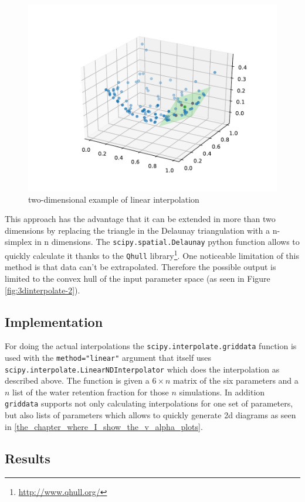 \begin{figure}[h] %
	\centering
	\includegraphics[width=0.8\linewidth]{images/vis2d3.pdf}
	\caption{two-dimensional example of linear interpolation}
	\label{fig:3dinterpolate-3}
\end{figure}

This approach has the advantage that it can be extended in more than two dimensions by replacing the triangle in the Delaunay triangulation with a n-simplex in n dimensions. The \texttt{scipy.spatial.Delaunay} python function allows to quickly calculate it thanks to the \texttt{Qhull} library\footnote{\url{http://www.qhull.org/}}. One noticeable limitation of this method is that data can't be extrapolated. Therefore the possible output is limited to the convex hull of the input parameter space (as seen in Figure \ref{fig:3dinterpolate-2}).

\subsection{Implementation}
\label{sec:griddata-implementation}
For doing the actual interpolations the \texttt{scipy.interpolate.griddata} function is used with the \texttt{method="linear"} argument that itself uses \texttt{scipy.interpolate.LinearNDInterpolator} which does the interpolation as described above. The function is given a $6\times n$ matrix of the six parameters and a $n$ list of the water retention fraction for those $n$ simulations. In addition \texttt{griddata} supports not only calculating interpolations for one set of parameters, but also lists of parameters which allows to quickly generate 2d diagrams as seen in \ref{the_chapter_where_I_show_the_v_alpha_plots}.

\subsection{Results}


